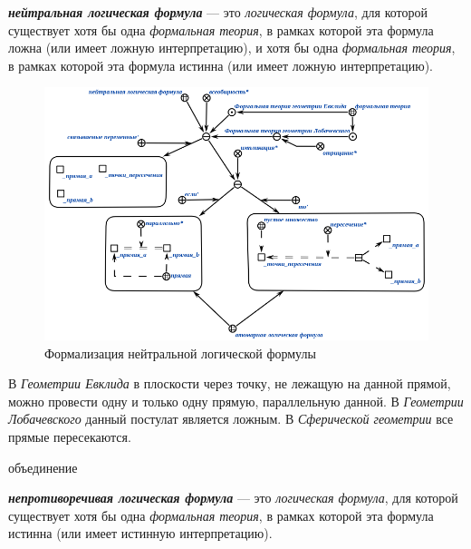 \begin{SCn}
\end{SCn}

\textbf{\textit{нейтральная логическая формула}} --- это \textit{логическая формула}, для которой существует хотя бы одна \textit{формальная теория}, в рамках которой эта формула ложна (или имеет ложную интерпретацию), и хотя бы одна \textit{формальная теория}, в рамках которой эта формула истинна (или имеет ложную интерпретацию).

\begin{figure}[http]
	\includegraphics[scale=0.8]{author/part2/figures/logic/neutral_formula.png}
	\caption{Формализация нейтральной логической формулы}
	\label{fig:neutral_formula}
\end{figure}

В \textit{Геометрии Евклида} в плоскости через точку, не лежащую на данной прямой, можно провести одну и только одну прямую, параллельную данной. В \textit{Геометрии Лобачевского} данный постулат является ложным.
В \textit{Сферической геометрии} все прямые пересекаются.

\begin{SCn}
\begin{scnreltoset}{объединение}
\end{scnreltoset}
\end{SCn}

\textbf{\textit{непротиворечивая логическая формула}} --- это \textit{логическая формула}, для которой существует хотя бы одна \textit{формальная теория}, в рамках которой эта формула истинна (или имеет истинную интерпретацию).

